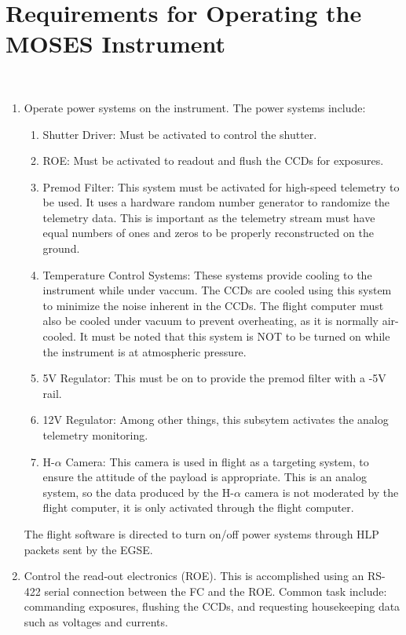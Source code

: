 %
\section{Requirements for Operating the MOSES Instrument}
\hrulefill
\\
\begin{enumerate}
  \item Operate power systems on the instrument. The power systems include: 
	\begin{enumerate}
		\item Shutter Driver: Must be activated to control the shutter.
		\item ROE: Must be activated to readout and flush the CCDs for exposures.
		\item Premod Filter: This system must be activated for high-speed telemetry to be used. It uses a hardware random number generator to randomize the telemetry data. This is important as the telemetry stream must have equal numbers of ones and zeros to be properly reconstructed on the ground.
		\item Temperature Control Systems: These systems provide cooling to the instrument while under vaccum. The CCDs are cooled using this system to minimize the noise inherent in the CCDs. The flight computer must also be cooled under vacuum to prevent overheating, as it is normally air-cooled. It must be noted that this system is NOT to be turned on while the instrument is at atmospheric pressure.
		\item 5V Regulator: This must be on to provide the premod filter with a -5V rail.
		\item 12V Regulator: Among other things, this subsytem activates the analog telemetry monitoring.
		\item H-$\alpha$ Camera: This camera is used in flight as a targeting system, to ensure the attitude of the payload is appropriate. This is an analog system, so the data produced by the H-$\alpha$ camera is not moderated by the flight computer, it is only activated through the flight computer.
	\end{enumerate}
The flight software is directed to turn on/off power systems through HLP packets sent by the EGSE.

  \item Control the read-out electronics (ROE). This is accomplished using an RS-422 serial connection between the FC and the ROE. Common task include: commanding exposures, flushing the CCDs, and requesting housekeeping data such as voltages and currents.
  

\end{enumerate}
